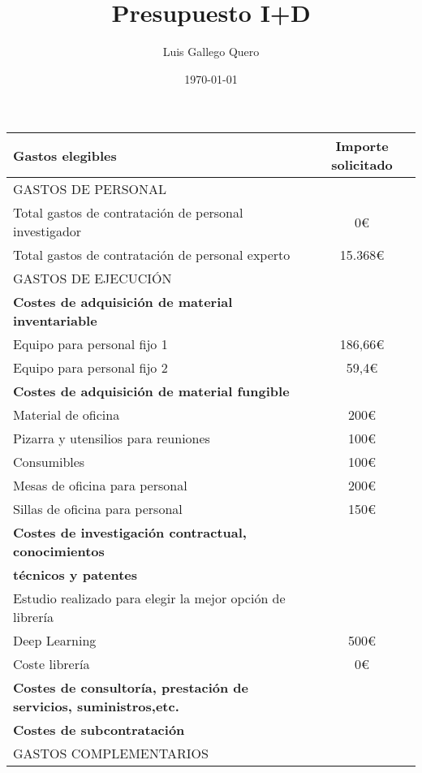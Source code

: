 \documentclass[a4paper,12pt,oneside]{article}
\title{Presupuesto I+D}
\author{Luis Gallego Quero}
\date{\today}
\begin{document}
\maketitle			
 
\begin{table}[H]
		\begin{tabular}{|l|c|} \toprule
		\cellcolor{red} Gastos elegibles & Importe solicitado \\
		\hline \hline
		\cellcolor[gray]{0.5}GASTOS DE PERSONAL &  \\ \hline
		Total gastos de contratación de personal investigador & 0\euro \\ \hline
		Total gastos de contratación de personal experto & 15.368\euro \\ \hline
		\cellcolor[gray]{0.5}GASTOS DE EJECUCIÓN &  \\ \hline
		\cellcolor[gray]{0.8}\textbf{Costes de adquisición de material inventariable} &  \\ \hline
		Equipo para personal fijo 1 & 186,66\euro  \\ \hline
		Equipo para personal fijo 2 & 59,4\euro \\ \hline
		\cellcolor[gray]{0.8}\textbf{Costes de adquisición de material fungible} &  \\ \hline
		Material de oficina & 200\euro \\ \hline
		Pizarra y utensilios para reuniones & 100\euro \\ \hline
		Consumibles & 100\euro \\ \hline
		Mesas de oficina para personal &  200\euro \\ \hline
		Sillas de oficina para personal &  150\euro \\ \hline
		\cellcolor[gray]{0.8}\textbf{Costes de investigación contractual, conocimientos } \\
		\cellcolor[gray]{0.8}\textbf{técnicos y patentes} & \\ \hline
		Estudio realizado para elegir la mejor opción de librería\\
		Deep Learning & 500\euro   \\ \hline
		Coste librería & 0\euro \\ \hline
		\cellcolor[gray]{0.8}\textbf{Costes de consultoría, prestación de servicios, suministros,etc.} &  \\ \hline
		\cellcolor[gray]{0.8}\textbf{Costes de subcontratación} &  \\ \hline
		\cellcolor[gray]{0.5}GASTOS COMPLEMENTARIOS &  \\ \hline

\end{tabular}
\end{table}
\end{document}
